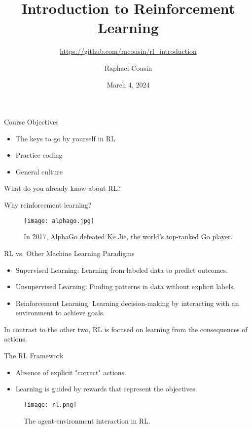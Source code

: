 \documentclass{beamer}
\title[]{Introduction to Reinforcement Learning}
\subtitle{\url{https://github.com/racousin/rl_introduction}}
\author{Raphael Cousin}
\date{March 4, 2024}
\begin{document}
\begin{frame}
  \titlepage
\end{frame}





\begin{frame}{Course Objectives}
    \begin{itemize}
\item{The keys to go by yourself in RL}

\item{Practice coding}

\item{General culture}
    \end{itemize}
What do you already know about RL?
\end{frame}

\begin{frame}{Why reinforcement learning?}
        \begin{figure}
        \centering
        \texttt{[image: alphago.jpg]}
        \caption{In 2017, AlphaGo defeated Ke Jie, the world's top-ranked Go player.}
    \end{figure}
\end{frame}

\begin{frame}{RL vs. Other Machine Learning Paradigms}
    \begin{itemize}
        \item Supervised Learning: Learning from labeled data to predict outcomes.
        \item Unsupervised Learning: Finding patterns in data without explicit labels.
        \item Reinforcement Learning: Learning decision-making by interacting with an environment to achieve goals.
    \end{itemize}
    In contrast to the other two, RL is focused on learning from the consequences of actions.
\end{frame}

\begin{frame}{The RL Framework}
    \begin{itemize}
        \item Absence of explicit "correct" actions.
        \item Learning is guided by rewards that represent the objectives.
    \end{itemize}
    \begin{figure}
        \centering
        \texttt{[image: rl.png]}
        \caption{The agent-environment interaction in RL.}
    \end{figure}
\end{frame}
\end{document}
